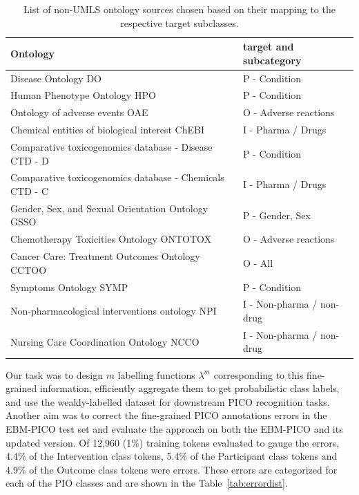 \documentclass[10.7pt,]{article}
\begin{document}
\begin{table}[!ht]
    \centering
    \begin{tabular}{|l|l|}
    \hline
        Ontology & target and subcategory \\ 
    \hline
        Disease Ontology DO & P - Condition \\ 
        Human Phenotype Ontology HPO & P - Condition \\ 
        Ontology of adverse events OAE & O - Adverse reactions \\ 
        Chemical entities of biological interest ChEBI & I - Pharma / Drugs \\ 
        Comparative toxicogenomics database - Disease CTD - D & P - Condition \\ 
        Comparative toxicogenomics database - Chemicals CTD - C & I - Pharma / Drugs \\ 
        Gender, Sex, and Sexual Orientation Ontology GSSO & P - Gender, Sex \\ 
        Chemotherapy Toxicities Ontology ONTOTOX & O - Adverse reactions \\ 
        Cancer Care: Treatment Outcomes Ontology CCTOO & O - All \\ 
        Symptoms Ontology SYMP & P - Condition \\ 
        Non-pharmacological interventions ontology NPI & I - Non-pharma / non-drug \\ 
        Nursing Care Coordination Ontology NCCO & I - Non-pharma / non-drug \\ \hline
    \end{tabular}
    \caption{\label{tab:source2targets} List of non-UMLS ontology sources chosen based on their mapping to the respective target subclasses.}
\end{table}


Our task was to design $m$ labelling functions $\lambda^{m}$ corresponding to this fine-grained information, efficiently aggregate them to get probabilistic class labels, and use the weakly-labelled dataset for downstream PICO recognition tasks.
Another aim was to correct the fine-grained PICO annotations errors in the EBM-PICO test set and evaluate the approach on both the EBM-PICO and its updated version.
%
Of 12,960 (1\%) training tokens evaluated to gauge the errors, 4.4\% of the Intervention class tokens, 5.4\% of the Participant class tokens and 4.9\% of the Outcome class tokens were errors.
These errors are categorized for each of the PIO classes and are shown in the Table~\ref{tab:errordist}.
%
\end{document}
